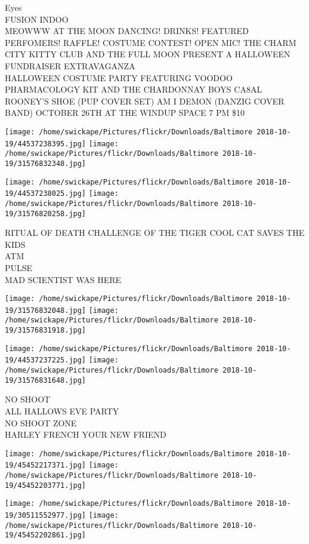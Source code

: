 \documentclass[10pt,letterpaper]{article}
\begin{document}
Eyes\\
FUSION INDOO\\
MEOWWW AT THE MOON DANCING!  DRINKS!  FEATURED PERFOMERS!  RAFFLE!  COSTUME CONTEST!  OPEN MIC!  THE CHARM CITY KITTY CLUB AND THE FULL MOON PRESENT A HALLOWEEN FUNDRAISER EXTRAVAGANZA\\
HALLOWEEN COSTUME PARTY FEATURING VOODOO PHARMACOLOGY KIT AND THE CHARDONNAY BOYS CA8AL ROONEY'S SHOE (PUP COVER SET) AM I DEMON (DANZIG COVER BAND) OCTOBER 26TH AT THE WINDUP SPACE 7 PM \$10\\
\pagebreak

\texttt{[image: /home/swickape/Pictures/flickr/Downloads/Baltimore 2018-10-19/44537238395.jpg]}
\texttt{[image: /home/swickape/Pictures/flickr/Downloads/Baltimore 2018-10-19/31576832348.jpg]}

\texttt{[image: /home/swickape/Pictures/flickr/Downloads/Baltimore 2018-10-19/44537238025.jpg]}
\texttt{[image: /home/swickape/Pictures/flickr/Downloads/Baltimore 2018-10-19/31576820258.jpg]}

RITUAL OF DEATH CHALLENGE OF THE TIGER COOL CAT SAVES THE KIDS\\
ATM\\
PULSE\\
MAD SCIENTIST WAS HERE\\
\pagebreak

\texttt{[image: /home/swickape/Pictures/flickr/Downloads/Baltimore 2018-10-19/31576832048.jpg]}
\texttt{[image: /home/swickape/Pictures/flickr/Downloads/Baltimore 2018-10-19/31576831918.jpg]}

\texttt{[image: /home/swickape/Pictures/flickr/Downloads/Baltimore 2018-10-19/44537237225.jpg]}
\texttt{[image: /home/swickape/Pictures/flickr/Downloads/Baltimore 2018-10-19/31576831648.jpg]}

NO SHOOT\\
ALL HALLOWS EVE PARTY\\
NO SHOOT ZONE\\
HARLEY FRENCH YOUR NEW FRIEND\\
\pagebreak

\texttt{[image: /home/swickape/Pictures/flickr/Downloads/Baltimore 2018-10-19/45452217371.jpg]}
\texttt{[image: /home/swickape/Pictures/flickr/Downloads/Baltimore 2018-10-19/45452203771.jpg]}

\texttt{[image: /home/swickape/Pictures/flickr/Downloads/Baltimore 2018-10-19/30511552977.jpg]}
\texttt{[image: /home/swickape/Pictures/flickr/Downloads/Baltimore 2018-10-19/45452202861.jpg]}
\end{document}
